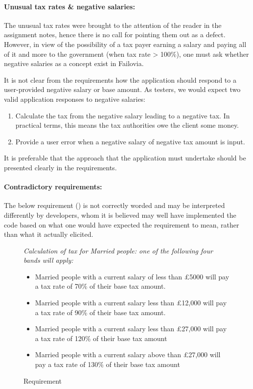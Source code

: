 \paragraph{Unusual tax rates \& negative salaries:}
The unusual tax rates were brought to the attention of the reader in the assignment notes, hence there is no call for pointing them out as a defect. However, in view of the possibility of a tax payer earning a salary and paying all of it and more to the government (when tax rate > 100\%), one must ask whether negative salaries as a concept exist in Failovia. 
\par
It is not clear from the requirements how the application should respond to a user-provided negative salary or base amount. As testers, we would expect two valid application responses to negative salaries: 

\begin{enumerate}
	\item Calculate the tax from the negative salary leading to a negative tax. In practical terms, this means the tax authorities owe the client some money.
	\item Provide a user error when a negative salary of negative tax amount is input. 
\end{enumerate}

It is preferable that the approach that the application must undertake should be presented clearly in the requirements.

\paragraph{Contradictory requirements:}
The below requirement (\REightFive) is not correctly worded and may be interpreted differently by developers, whom it is believed may well have implemented the code based on what one would have expected the requirement to mean, rather than what it actually elicited. 
\par
\begin{figure}[H]
\begin{mdframed}
{
\it
\footnotesize
Calculation of tax for Married people: one of the following four bands will apply:
\begin{itemize}
	\item Married people with a current salary of less than £5000 will pay a tax rate of
	70\% of their base tax amount.
	\item Married people with a current salary less than £12,000 will pay a tax rate of
	90\% of their base tax amount.
	\item Married people with a current salary less than £27,000 will pay a tax rate of
	120\% of their base tax amount
	\item Married people with a current salary above than £27,000 will pay a tax rate
	of 130\% of their base tax amount
\end{itemize}	
}
\end{mdframed}
\caption{Requirement \REightFive}
\end{figure} 


